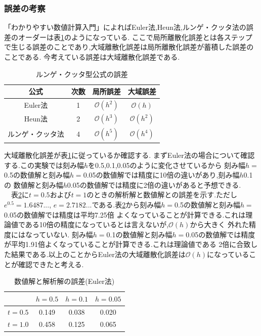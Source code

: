 \documentclass[dvipdfmx]{jarticle}
\begin{document}
    \subsubsection{誤差の考察}
    「わかりやすい数値計算入門」\cite{wakari}によればEuler法,Heun法,ルンゲ・クッタ法の誤差のオーダーは表\ref{rkgosa}のようになっている.
    ここで局所離散化誤差とは各ステップで生じる誤差のことであり,大域離散化誤差は局所離散化誤差が蓄積した誤差のことである.
    今考えている誤差は大域離散化誤差である.
    \begin{table}[H]
      \caption{ルンゲ・クッタ型公式の誤差}
    \label{rkgosa}
    \begin{center}
        \begin{tabular}{c|c|c|c}\hline
          公式 & 次数 & 局所誤差 & 大域誤差 \\ \hline \hline
          Euler法 & 1 & $\mathcal{O}(h^2)$ & $\mathcal{O}(h)$ \\ 
          Heun法 & 2 & $\mathcal{O}(h^3)$ & $\mathcal{O}(h^2)$ \\
          ルンゲ・クッタ法 & 4 & $\mathcal{O}(h^5)$ & $\mathcal{O}(h^4)$ \\ \hline
        \end{tabular}
    \end{center}
    \end{table}
    
    大域離散化誤差が表\ref{rkgosa}に従っているか確認する.
    まずEuler法の場合について確認する.この実験では刻み幅$h$を0.5,0.1,0.05のように変化させているから
    刻み幅$h=$0.5の数値解と刻み幅$h=$0.05の数値解では精度に10倍の違いがあり,刻み幅$h$0.1の
    数値解と刻み幅$h$0.05の数値解では精度に2倍の違いがあると予想できる.\\
    　表\ref{eulergosa}に$t=0.5$および$t=1$のときの解析解と数値解との誤差を示す.ただし$e^{0.5}=1.6487...$,
    $e=2.7182...$である.表\ref{eulergosa}から刻み幅$h=$0.5の数値解と刻み幅$h=$0.05の数値解では精度は平均7.25倍
    よくなっていることが計算できる.これは理論値である10倍の精度になっているとは言えないが,$\mathcal{O}(h)$から大きく
    外れた精度にはなっていない.
    刻み幅$h=$0.1の数値解と刻み幅$h=$0.05の数値解では精度が平均1.91倍よくなっていることが計算できる.これは理論値である
    2倍に合致した結果である.以上のことからEuler法の大域離散化誤差は$\mathcal{O}(h)$になっていることが確認できたと考える.

    \begin{table}[H]
      \caption{数値解と解析解の誤差(Euler法)}
    \label{eulergosa}
    \begin{center}
        \begin{tabular}{c|c|c|c}\hline 
          & $h=0.5$ & $h=0.1$ & $h=0.05$ \\ \hline \hline 
          $t=0.5$ & 0.149 & 0.038 & 0.020 \\ 
          $t=1.0$ & 0.458 & 0.125 & 0.065 \\ \hline
        \end{tabular}
    \end{center}
    \end{table}    
\end{document}
